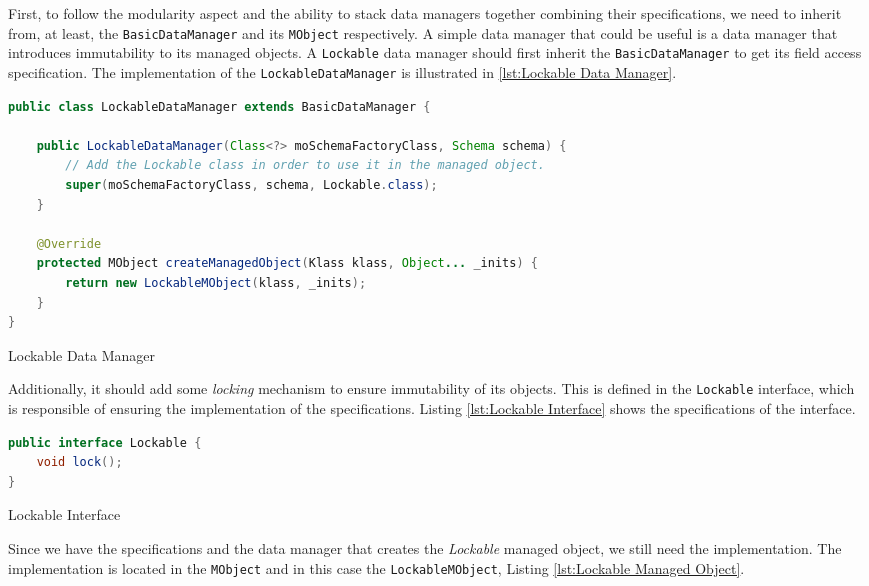 First, to follow the modularity aspect and the ability to stack data managers together combining their specifications, we need to inherit from, at least, the \texttt{BasicDataManager} and its \texttt{MObject} respectively.
A simple data manager that could be useful is a data manager that introduces immutability to its managed objects.
A \texttt{Lockable} data manager should first inherit the \texttt{BasicDataManager} to get its field access specification.
The implementation of the \texttt{LockableDataManager} is illustrated in \ref{lst:Lockable Data Manager}.

\begin{sourcecode} [H]
	\begin{lstlisting}[language=Java, escapechar=|]
public class LockableDataManager extends BasicDataManager {

	public LockableDataManager(Class<?> moSchemaFactoryClass, Schema schema) {
		// Add the Lockable class in order to use it in the managed object.
		super(moSchemaFactoryClass, schema, Lockable.class);
	}

	@Override
	protected MObject createManagedObject(Klass klass, Object... _inits) {
		return new LockableMObject(klass, _inits);
	}
}
	\end{lstlisting}
	\caption{Lockable Data Manager}
	\label{lst:Lockable Data Manager}
\end{sourcecode}

Additionally, it should add some \textit{locking} mechanism to ensure immutability of its objects.
This is defined in the \texttt{Lockable} interface, which is responsible of ensuring the implementation of the specifications. 
Listing \ref{lst:Lockable Interface} shows the specifications of the interface.

\begin{sourcecode} [H]
	\begin{lstlisting}[language=Java, escapechar=|]
public interface Lockable {
	void lock();
}
	\end{lstlisting}
	\caption{Lockable Interface}
	\label{lst:Lockable Interface}
\end{sourcecode}

Since we have the specifications and the data manager that creates the \textit{Lockable} managed object, we still need the implementation.
The implementation is located in the \texttt{MObject} and in this case the \texttt{LockableMObject}, 
Listing \ref{lst:Lockable Managed Object}.


